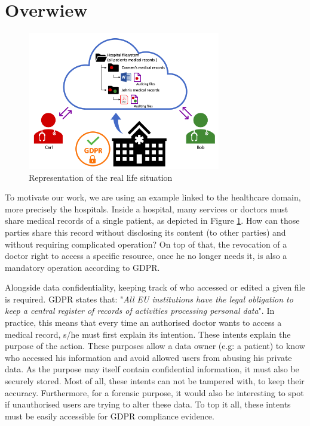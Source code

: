 \documentclass[../main.tex]{subfiles}
\begin{document}
\section{Overwiew}
\label{section:problem:overview}

\begin{figure}[h]
    \centering
    \includegraphics[width=0.75\textwidth]{images/problem/overview}
    
    \caption{Representation of the real life situation}
    \label{figure:problem:overview}
\end{figure}

\par To motivate our work, we are using an example linked to the healthcare domain, more precisely the hospitals. Inside a hospital, many services or doctors must share medical records of a single patient, as depicted in Figure \ref{figure:problem:overview}. How can those parties share this record without disclosing its content (to other parties) and without requiring complicated operation? On top of that, the revocation of a doctor right to access a specific resource, once he no longer needs it, is also a mandatory operation according to GDPR.

\medbreak
\par Alongside data confidentiality, keeping track of who accessed or edited a given file is required. GDPR states that: "\textit{All EU institutions have the legal obligation to keep a central register of records of activities processing personal data}". In practice, this means that every time an authorised doctor wants to access a medical record, s/he must first explain its intention. These intents explain the purpose of the action. These purposes allow a data owner (e.g: a patient) to know who accessed his information and avoid allowed users from abusing his private data. As the purpose may itself contain confidential information, it must also be securely stored. Most of all, these intents can not be tampered with, to keep their accuracy. Furthermore, for a forensic purpose, it would also be interesting to spot if unauthorised users are trying to alter these data. To top it all, these intents must be easily accessible for GDPR compliance evidence.
\end{document}
